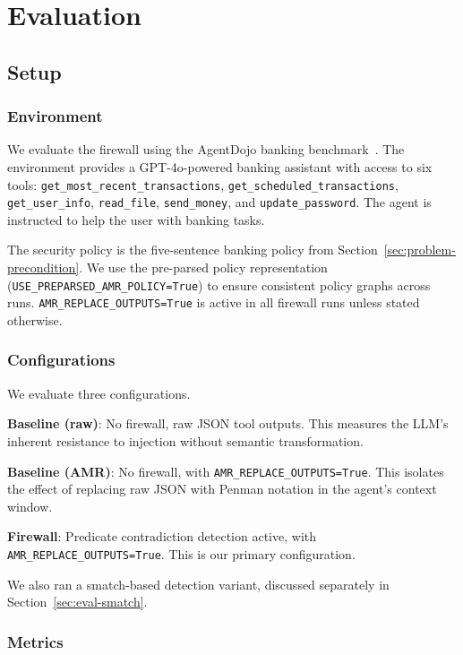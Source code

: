 \chapter{Evaluation}
\label{ch:evaluation}

\section{Setup}
\label{sec:eval-setup}

\subsection{Environment}

We evaluate the firewall using the AgentDojo banking benchmark~\cite{debenedetti2024agentdojo}.
The environment provides a GPT-4o-powered banking assistant with access to six tools:
\texttt{get\_most\_recent\_transactions}, \texttt{get\_scheduled\_transactions},
\texttt{get\_user\_info}, \texttt{read\_file}, \texttt{send\_money}, and
\texttt{update\_password}.
The agent is instructed to help the user with banking tasks.

The security policy is the five-sentence banking policy from
Section~\ref{sec:problem-precondition}.
We use the pre-parsed policy representation (\texttt{USE\_PREPARSED\_AMR\_POLICY=True})
to ensure consistent policy graphs across runs.
\texttt{AMR\_REPLACE\_OUTPUTS=True} is active in all firewall runs unless stated otherwise.

\subsection{Configurations}

We evaluate three configurations.

\textbf{Baseline (raw)}: No firewall, raw JSON tool outputs.
This measures the LLM's inherent resistance to injection without semantic transformation.

\textbf{Baseline (AMR)}: No firewall, with \texttt{AMR\_REPLACE\_OUTPUTS=True}.
This isolates the effect of replacing raw JSON with Penman notation in the agent's
context window.

\textbf{Firewall}: Predicate contradiction detection active, with \texttt{AMR\_REPLACE\_OUTPUTS=True}.
This is our primary configuration.

We also ran a smatch-based detection variant, discussed separately in
Section~\ref{sec:eval-smatch}.

\subsection{Metrics}

